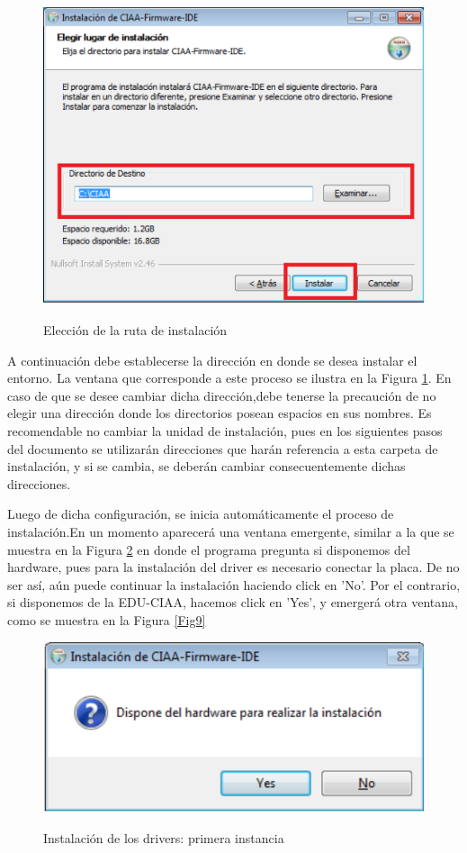 \documentclass[12pt,letterpaper]{article}
\begin{document}
\begin{figure}[!h]
\centering
\includegraphics[width=8 cm]{figuras/instalacion4.png}\\
\caption{Elección de la ruta de instalación}
\label{Fig7}
\end{figure}

A continuación debe  establecerse la dirección en donde se desea instalar el entorno. La ventana que corresponde a este proceso se ilustra en la Figura \ref{Fig7}. En caso de que se desee cambiar dicha dirección,debe tenerse la precaución de no elegir una dirección donde los directorios posean espacios en sus nombres. Es recomendable no cambiar la unidad de instalación, pues en los siguientes pasos del documento se utilizarán direcciones que harán referencia a esta carpeta de instalación, y si se cambia, se deberán cambiar consecuentemente dichas direcciones.

Luego de dicha configuración, se inicia automáticamente el proceso de instalación.En un momento aparecerá una
ventana emergente, similar a la que se muestra en la Figura \ref{Fig8} en donde el programa pregunta si disponemos del hardware, pues para la instalación del driver es necesario conectar la placa. De no  ser así, aún puede continuar la instalación haciendo click en 'No'. Por el contrario, si disponemos de la EDU-CIAA, hacemos click en 'Yes', y emergerá otra ventana, como se muestra en la Figura \ref{Fig9}

\begin{center}
\begin{figure}[!h]
\centering
\includegraphics[width=6 cm]{figuras/instalacion5.png}\\
\caption{Instalación de los drivers: primera instancia}
\label{Fig8}
\end{figure}
\end{center}
\end{document}
